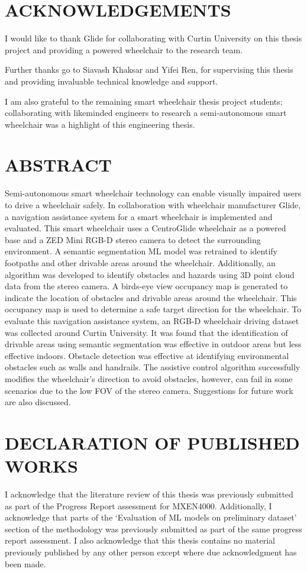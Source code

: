 \section*{ACKNOWLEDGEMENTS}
I would like to thank Glide for collaborating with Curtin University on this thesis project
and providing a powered wheelchair to the research team.

Further thanks go to Siavash Khaksar and Yifei Ren,
for supervising this thesis and providing invaluable technical knowledge and support.

I am also grateful to the remaining smart wheelchair thesis project students;
collaborating with likeminded engineers to research a semi-autonomous smart
wheelchair was a highlight of this engineering thesis.

\cleardoublepage

\section*{ABSTRACT}
Semi-autonomous smart wheelchair technology can enable visually impaired users to drive a wheelchair
safely. In collaboration with wheelchair manufacturer Glide, a navigation assistance system for a
smart wheelchair is implemented and evaluated. This smart wheelchair uses a CentroGlide wheelchair
as a powered base and a ZED Mini RGB-D stereo camera to detect the surrounding environment.
A semantic segmentation ML model was retrained to identify footpaths and other drivable areas around the wheelchair.
Additionally, an algorithm was developed to identify obstacles and hazards using 3D point cloud data from the stereo camera.
A birds-eye view occupancy map is generated to indicate the location of obstacles and drivable areas
around the wheelchair. This occupancy map is used to determine a safe target direction for the wheelchair.
To evaluate this navigation assistance system, an RGB-D wheelchair driving dataset was collected
around Curtin University. It was found that the identification of drivable areas using semantic segmentation was effective in outdoor
areas but less effective indoors. Obstacle detection was effective at identifying environmental obstacles such as
walls and handrails. The assistive control algorithm successfully modifies the wheelchair's direction to avoid obstacles,
however, can fail in some scenarios due to the low FOV of the stereo camera. Suggestions for future work are also discussed.
\cleardoublepage

\section*{DECLARATION OF PUBLISHED WORKS}
I acknowledge that the literature review of this thesis was previously submitted as part of the Progress Report assessment for MXEN4000.
Additionally, I acknowledge that parts of the `Evaluation of ML models on preliminary dataset'
section of the methodology was previously submitted as part of the same progress report assessment.
I also acknowledge that this thesis contains no material previously
published by any other person except where due acknowledgment has been made.

